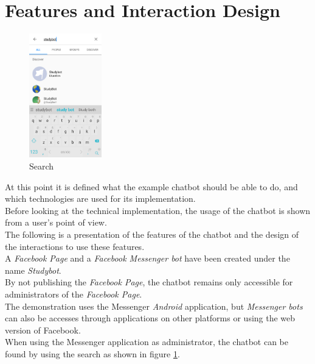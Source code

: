 \section{Features and Interaction Design}
\label{implementation}


\begin{figure}
  \centering
  \includegraphics[width=0.28\textwidth]{images/interface/01-search.png}
	\caption{Search}
	\label{fig:01-search}
\end{figure}

At this point it is defined what the example chatbot should be able to do,
and which technologies are used for its implementation.
\\

Before looking at the technical implementation,
the usage of the chatbot is shown from a user's point of view.
\\
The following is a presentation of the features of the chatbot
and the design of the interactions to use these features.
\\

A \emph{Facebook Page} and a \emph{Facebook Messenger bot} have been created under the name \emph{Studybot}.
\\
By not publishing the \emph{Facebook Page}, the chatbot remains only accessible for administrators of the \emph{Facebook Page}.
\\

The demonstration uses the Messenger \emph{Android} application,
but \emph{Messenger bots} can also be accesses through applications on other platforms
or using the web version of Facebook.
\\

When using the Messenger application as administrator,
the chatbot can be found by using the search as shown in figure \ref{fig:01-search}.
\\


